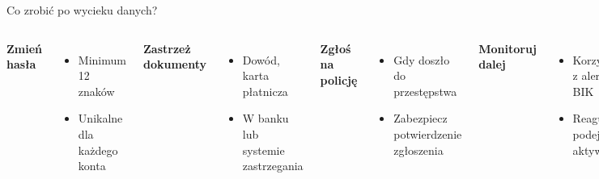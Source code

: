\begin{frame}{Co zrobić po wycieku danych?}
\begin{columns}[t]
    \textbf{Zmień hasła}
    \begin{itemize}
        \item Minimum 12 znaków
        \item Unikalne dla każdego konta
    \end{itemize}
    \vspace{0.5em}
    \textbf{Zastrzeż dokumenty}
    \begin{itemize}
        \item Dowód, karta płatnicza
        \item W banku lub systemie zastrzegania
    \end{itemize}
    \textbf{Zgłoś na policję}
    \begin{itemize}
        \item Gdy doszło do przestępstwa
        \item Zabezpiecz potwierdzenie zgłoszenia
    \end{itemize}
    \vspace{0.5em}
    \textbf{Monitoruj dalej}
    \begin{itemize}
        \item Korzystaj z alertów BIK
        \item Reaguj na podejrzane aktywności
    \end{itemize}
\end{columns}
\end{frame}